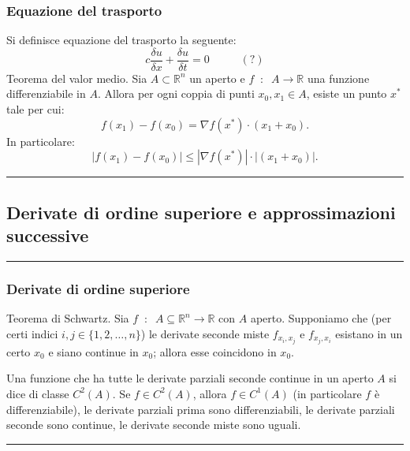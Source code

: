 \subsubsection*{Equazione del trasporto}
Si definisce equazione del trasporto la seguente:
\[
    c \frac{\delta u}{\delta x} + \frac{\delta u}{\delta t} = 0 \;\;\;\;\; \;\;\;\;\; (?)
\]
\newline
Teorema del valor medio. Sia $A \subset \mathbb{R}^n$ un aperto e $f \;\;:\;\; A \rightarrow \mathbb{R}$ una funzione differenziabile in $A$. Allora per ogni coppia di punti $x_0, x_1 \in A$, esiste un punto $x^*$ tale per cui:
\[
    f(x_1)- f(x_0) = \nabla f(x^*) \cdot  (x_1 + x_0).
\]
In particolare:
\[
    |f(x_1) - f(x_0)| \leq |\nabla f(x^*)| \cdot |(x_1 + x_0)|.
\]
\rule{\textwidth}{2pt}

\subsection*{Derivate di ordine superiore e approssimazioni successive}
\rule{\textwidth}{0.4pt}
\subsubsection*{Derivate di ordine superiore}
Teorema di Schwartz. Sia $f \;\;:\;\; A \subseteq \mathbb{R}^n \rightarrow \mathbb{R}$ con $A$ aperto. Supponiamo che (per certi indici $i,j \in \{1,2,\dots,n\}$) le derivate seconde miste $f_{x_i, x_j}$ e $f_{x_j, x_i}$ esistano in un certo $x_0$ e siano continue in $x_0$; allora esse coincidono in $x_0$.\newline

Una funzione che ha tutte le derivate parziali seconde continue in un aperto $A$ si dice di classe $C^2(A)$.\newline
Se $f \in C^2(A)$, allora $f \in C^1(A)$ (in particolare $f$ è differenziabile), le derivate parziali prima sono differenziabili, le derivate parziali seconde sono continue, le derivate seconde miste sono uguali.
\rule{\textwidth}{2pt}
